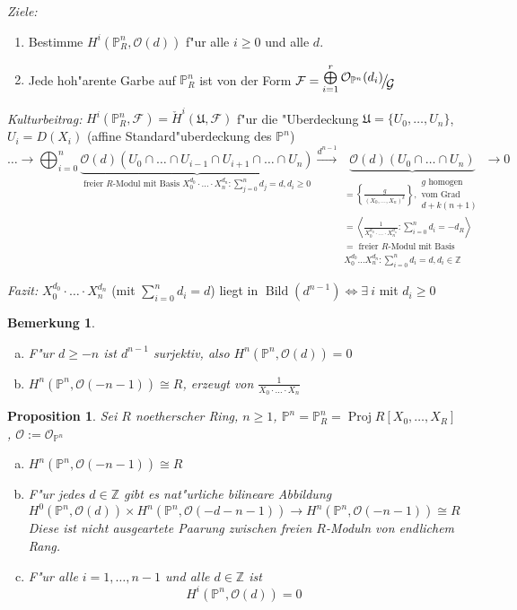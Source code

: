 \documentclass[paper = A4, fontsize=12pt, numbers=noendperiod, chapterprefix=true]{scrbook}
\theoremstyle{break}
\newtheorem{Bem}[Def]{Bemerkung}
\newtheorem{Prop}[Def]{Proposition}
\theoremstyle{nonumberbreak}
\theoremstyle{nonumberplain}
\newcommand{\Sum}{\sum\limits}
\DeclareMathOperator{\Bild}{Bild}
\DeclareMathOperator{\Proj}{Proj}
\newcommand{\IP}{\mathbb{P}}%
\newcommand{\Z}{\mathbb{Z}}
\newcommand{\calF}{\mathcal{F}}
\newcommand{\calG}{\mathcal{G}}
\newcommand{\calO}{\mathcal{O}}
\newcommand{\X}{\times}
\newcommand{\FakRaum}[2]{
	\raisebox{0.7ex}{\ensuremath{#1}}
	\ensuremath{\mkern-3mu}\big/\ensuremath{\mkern-3mu}
	\raisebox{-0.6ex}{\ensuremath{#2}}}
\begin{document}
\textit{Ziele:}\begin{enumerate}[1)]
\item
	Bestimme $H^i(\IP_R^n, \calO(d))$ f"ur alle $i \ge 0$ und alle $d$.
\item
	Jede hoh"arente Garbe auf $\IP_R^n$ ist von der Form $\calF= \FakRaum{\bigoplus\limits_{i = 1}^{r} \calO_{\IP^n}(d_i)}{\calG}$
\end{enumerate}
\textit{Kulturbeitrag:} $H^{i}(\IP_R^n, \calF) = \check H^{i}(\mathfrak{U}, \calF)$ f"ur die "Uberdeckung $\mathfrak{U} = \{U_0,\ldots ,U_n\}$, $U_i = D(X_i)$ (affine Standard"uberdeckung des $\IP^n$)
	\[ \ldots \to \bigoplus_{i=0}^n \underbrace{\calO(d)(U_0\cap\ldots \cap U_{i-1} \cap U_{i+1} \cap \ldots \cap U_n)}_{\text{freier } R\text{-Modul mit Basis } X_0^{d_0} \cdot \ldots \cdot X_n^{d_n} : \Sum_{j=0}^n d_j = d, d_i \ge 0} \overset{d^{n-1}}{\to} \underbrace{\calO(d)(U_0 \cap \ldots \cap U_n)}_{\substack{= \left\{ \frac{g}{(X_0,\ldots ,X_n)^k} \right\}, \substack{g \text{ homogen}\\ \text{vom Grad} \\ d+k(n+1)} \\ = \left\langle \frac{1}{X_0^{d_0}\cdot \ldots \cdot X_n^{d_n}}: \Sum_{i=0}^n d_i = -d_R \right\rangle \\ = \text{ freier } R\text{-Modul mit Basis} \\ X_0^{d_0} \ldots X_n^{d_n} : \Sum_{i=0}^n d_i = d, d_i \in \Z}} \to 0 \]

\textit{Fazit:} $X_0^{d_0} \cdot \ldots \cdot X_n^{d_n}$ (mit $\Sum_{i=0}^n d_i = d$) liegt in $\Bild(d^{n-1}) \Leftrightarrow\exists \ i$ mit $d_i \ge 0$

\begin{Bem}\label{15.2}\begin{enumerate}[a)]
\item\label{15.2a}
	F"ur $d \ge -n$ ist $d^{n-1}$ surjektiv, also $H^n(\IP^n, \calO(d)) = 0$
\item
	$H^n(\IP^n, \calO(-n-1)) \cong R$, erzeugt von $\frac{1}{X_0\cdot \ldots \cdot X_n}$
\end{enumerate}\end{Bem}

\begin{Prop}
Sei $R$ noetherscher Ring, $n \ge 1$, $\IP^n = \IP_R^n = \Proj R[X_0,\ldots ,X_R]$, $\calO := \calO_{\IP^n}$
\begin{enumerate}[a)]
\item
	$H^n(\IP^n, \calO(-n-1)) \cong R$
\item
	F"ur jedes $d \in \Z$ gibt es nat"urliche bilineare Abbildung
		\[ H^0(\IP^n, \calO(d)) \X H^n(\IP^n, \calO(-d-n-1)) \to H^n(\IP^n, \calO(-n-1)) \cong R \]
	Diese ist nicht ausgeartete Paarung zwischen freien $R$-Moduln von endlichem Rang.
\item
	F"ur alle $i = 1,\ldots ,n-1$ und alle $d \in \Z$ ist
		\[ H^{i}(\IP^n, \calO(d)) = 0 \]
\end{enumerate}\end{Prop}
\end{document}

